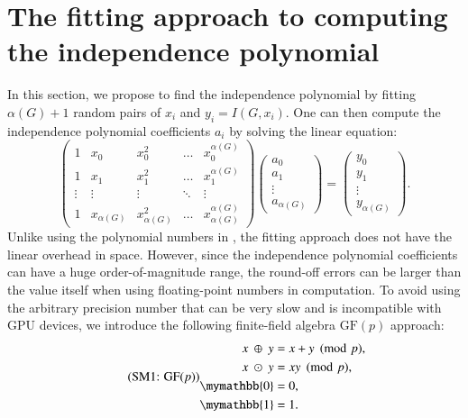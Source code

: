 \documentclass[review, onefignum, onetabnum]{siamart190516}
\begin{document}
\section{The fitting approach to computing the independence polynomial}\label{sec:finitefield}
In this section, we propose to find the independence polynomial by fitting $\alpha(G)+1$ random pairs of $x_{i}$ and $y_{i} = I(G,x_{i})$. One can then compute the independence polynomial coefficients $a_{i}$ by solving the linear equation: 
\begin{equation}
\left(\begin{matrix}
1 & x_0 & x_0^2 & \ldots & x_0^{\alpha(G)} \\
1 & x_1 & x_1^2 & \ldots & x_1^{\alpha(G)} \\
\vdots & \vdots & \vdots &\ddots & \vdots \\
1 & x_{\alpha(G)} & x_{\alpha(G)}^2 & \ldots & x_{\alpha(G)}^{\alpha(G)}
\end{matrix}\right)
\left(\begin{matrix}
a_0 \\ a_1 \\ \vdots \\ a_{\alpha(G)}
\end{matrix}\right)
= \left(\begin{matrix}
y_0 \\ y_1 \\ \vdots \\ y_{\alpha(G)}
\end{matrix}\right).\label{eq:lineareq}
\end{equation}
Unlike using the polynomial numbers in ,  the fitting approach does not have the linear overhead in space.
However, since the independence polynomial coefficients can have a huge order-of-magnitude range, the round-off errors can be larger than the value itself when using floating-point numbers in computation.
To avoid using the arbitrary precision number that can be very slow and is incompatible with GPU devices, we introduce the following finite-field algebra $\text{GF}(p)$ approach:
\begin{equation}
\eqname{GF$(p)$}
\begin{split}
    x ~\oplus~ y &= x+y\pmod p,\\
    x ~\odot~ y &= xy\pmod p,\\
    \mymathbb{0} &= 0,\\
    \mymathbb{1} &= 1.
\end{split}\label{eq:finitefield}
\end{equation}
\end{document}
